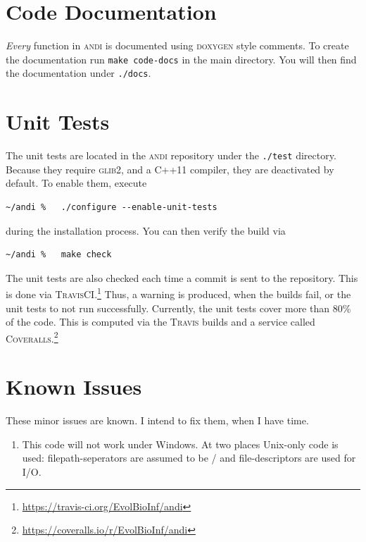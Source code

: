 \documentclass[a4paper,
  10pt,
  english,
  DIV=12,
  BCOR=8mm]{scrbook}
\newcommand{\algo}[1]{\textsc{{#1}}}
\newcommand{\andi}{\algo{andi} }
\begin{document}
\section{Code Documentation}

\emph{Every} function in \andi is documented using \algo{doxygen} style comments. To create the documentation run \lstinline$make code-docs$ in the main directory. You will then find the documentation under \lstinline$./docs$.


\section{Unit Tests}

The unit tests are located in the \andi repository under the \lstinline$./test$ directory. Because they require \algo{glib2}, and a C++11 compiler, they are deactivated by default. To enable them, execute

\begin{lstlisting}
~/andi %   ./configure --enable-unit-tests
\end{lstlisting}

\noindent during the installation process. You can then verify the build via 

\begin{lstlisting}
~/andi %   make check
\end{lstlisting}

\noindent The unit tests are also checked each time a commit is sent to the repository. This is done via \algo{TravisCI}.\footnote{\url{https://travis-ci.org/EvolBioInf/andi}} Thus, a warning is produced, when the builds fail, or the unit tests to not run successfully. Currently, the unit tests cover more than 80\% of the code. This is computed via the \algo{Travis} builds and a service called \algo{Coveralls}.\footnote{\url{https://coveralls.io/r/EvolBioInf/andi}}

\section{Known Issues}

These minor issues are known. I intend to fix them, when I have time.

\begin{enumerate}
  \item This code will not work under Windows. At two places Unix-only code is used: filepath-seperators are assumed to be / and file-descriptors are used for I/O.
\end{enumerate}
\end{document}
